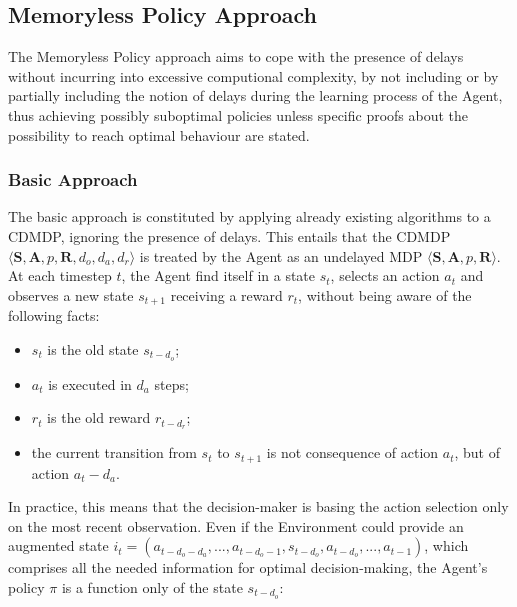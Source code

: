         \newpage
        \subsection{Memoryless Policy Approach}
            \label{subs:memorylessapproach}
            The Memoryless Policy approach aims to cope with the presence of delays without incurring into excessive computional complexity, by not including or by partially including the notion of delays during the learning process of the Agent, thus achieving possibly suboptimal policies unless specific proofs about the possibility to reach optimal behaviour are stated.
            
            \subsubsection{Basic Approach}
                The basic approach is constituted by applying already existing algorithms to a CDMDP, ignoring the presence of delays. This entails that the CDMDP $\langle \mathbf{S}, \mathbf{A}, p, \mathbf{R}, d_o, d_a, d_r \rangle$ is treated by the Agent as an undelayed MDP $\langle \mathbf{S}, \mathbf{A}, p, \mathbf{R} \rangle$. At each timestep $t$, the Agent find itself in a state $s_t$, selects an action $a_t$ and observes a new state $s_{t+1}$ receiving a reward $r_t$, without being aware of the following facts:
                \begin{itemize}[topsep=0.5em, partopsep=0.5em]
                        \setlength\itemsep{0em}
                        \item $s_t$ is the old state $s_{t-d_o}$;
                        \item $a_t$ is executed in $d_a$ steps;
                        \item $r_t$ is the old reward $r_{t-d_r}$;
                        \item the current transition from $s_t$ to $s_{t+1}$ is not consequence of action $a_t$, but of action $a_t-d_a$.
                \end{itemize}
                
                In practice, this means that the decision-maker is basing the action selection only on the most recent observation. Even if the Environment could provide an augmented state $i_t = \left( a_{t-d_{o}-d_{a}}, ..., a_{t-d_{o}-1}, s_{t-d_{o}}, a_{t-d_{o}}, ..., a_{t-1} \right)$, which comprises all the needed information for optimal decision-making, the Agent's policy $\pi$ is a function only of the state $s_{t-d_{o}}$:
                
